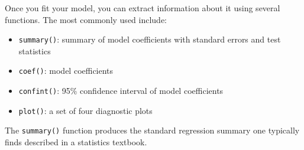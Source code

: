 \documentclass[
]{book}
\providecommand{\tightlist}{%
  \setlength{\itemsep}{0pt}\setlength{\parskip}{0pt}}
\begin{document}
Once you fit your model, you can extract information about it using several functions. The most commonly used include:

\begin{itemize}
\tightlist
\item
  \texttt{summary()}: summary of model coefficients with standard errors and test statistics
\item
  \texttt{coef()}: model coefficients
\item
  \texttt{confint()}: 95\% confidence interval of model coefficients
\item
  \texttt{plot()}: a set of four diagnostic plots
\end{itemize}

The \texttt{summary()} function produces the standard regression summary one typically finds described in a statistics textbook.
\end{document}
